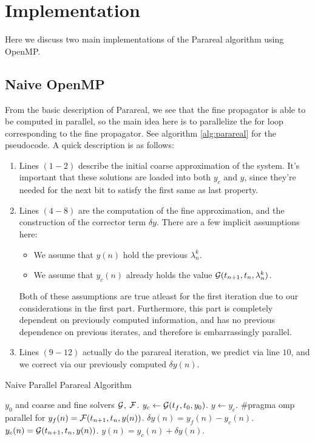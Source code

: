 \section{Implementation}

Here we discuss two main implementations of the Parareal algorithm using OpenMP.

\subsection{Naive OpenMP}

From the basic description of Parareal, we see that the fine propagator is able
to be computed in parallel, so the main idea here is to parallelize the for loop
corresponding to the fine propagator. See algorithm \ref{alg:parareal} for the
pseudocode. A quick description is as follows:
\begin{enumerate}[(1)]
  \item Lines $(1-2)$ describe the initial coarse approximation of the system.
    It's important that these solutions are loaded into both $y_c$ and $y$,
    since they're needed for the next bit to satisfy the first same as last
    property.
  \item Lines $(4-8)$ are the computation of the fine approximation, and the
    construction of the corrector term $\delta y$. There are a few implicit
    assumptions here:
    \begin{itemize}
      \item We assume that $y(n)$ hold the previous $\lambda_n^k$.
      \item We assume that $y_c(n)$ already holds the value $\mathcal{G}(t_{n+1},
        t_n, \lambda_n^k)$.
    \end{itemize}
    Both of these assumptions are true atleast for the first iteration due to
    our considerations in the first part. Furthermore, this part is completely
    dependent on previously computed information, and has no previous dependence
    on previous iterates, and therefore is embarrassingly parallel.
  \item Lines $(9-12)$ actually do the parareal iteration, we predict via line
    $10$, and we correct via our previously computed $\delta y(n)$.
\end{enumerate}
\begin{breakablealgorithm}
  \caption{Naive Parallel Parareal Algorithm}
  \label{alg:parareal}
  \begin{algorithmic}[1]
    \Require $y_0$ and coarse and fine solvers $\mathcal{G}$, $\mathcal{F}$.
    \State $y_c \gets \mathcal{G}(t_f, t_0, y_0)$.
    \State $y \gets y_c$.
      \State \#pragma omp parallel for
        \State $y_f(n) = \mathcal{F}(t_{n+1},t_n,y(n))$.
        \State $\delta y(n) = y_f(n) - y_c(n)$.
      \EndFor
        \State $y_c(n) = \mathcal{G}(t_{n+1},t_n,y(n))$.
        \State $y(n) = y_c(n) + \delta y(n)$.
      \EndFor
    \EndWhile
  \end{algorithmic}
\end{breakablealgorithm}

